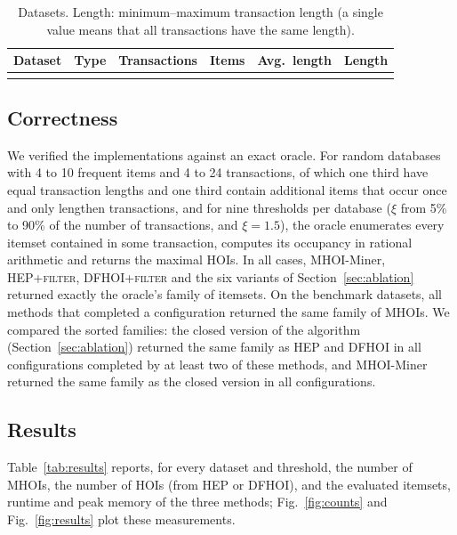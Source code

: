 \documentclass[pdflatex,sn-mathphys,Numbered]{sn-jnl}
\theoremstyle{thmstyleone}
\theoremstyle{thmstyletwo}
\theoremstyle{thmstylethree}
\newcommand{\Algo}{MHOI-Miner}
\begin{document}
\begin{table}[t]
\caption{Datasets. Length: minimum--maximum transaction length (a single value means that all transactions have the same length).}\label{tab:datasets}
\centering
\footnotesize
\begin{tabular}{@{}llrrrr@{}}
\toprule
Dataset & Type & Transactions & Items & Avg.\ length & Length \\
\midrule
{}{datasets.tex}
\botrule
\end{tabular}
\end{table}

\subsection{Correctness}\label{sec:correct-exp}

We verified the implementations against an exact oracle. For \NumOracleDatabases{} random databases with 4 to 10 frequent items and 4 to 24 transactions, of which one third have equal transaction lengths and one third contain additional items that occur once and only lengthen transactions, and for nine thresholds per database ($\xi$ from 5\% to 90\% of the number of transactions, and $\xi = 1.5$), the oracle enumerates every itemset contained in some transaction, computes its occupancy in rational arithmetic and returns the maximal HOIs. In all \NumOracleCases{} cases, \Algo{}, \textsc{HEP+filter}, \textsc{DFHOI+filter} and the six variants of Section~\ref{sec:ablation} returned exactly the oracle's family of itemsets. On the benchmark datasets, all methods that completed a configuration returned the same family of MHOIs. We compared the sorted families: the closed version of the algorithm (Section~\ref{sec:ablation}) returned the same family as HEP and DFHOI in all \SetParityChecked{} configurations completed by at least two of these methods, and \Algo{} returned the same family as the closed version in all \NumSettings{} configurations.

\subsection{Results}\label{sec:results}

Table~\ref{tab:results} reports, for every dataset and threshold, the number of MHOIs, the number of HOIs (from HEP or DFHOI), and the evaluated itemsets, runtime and peak memory of the three methods; Fig.~\ref{fig:counts} and Fig.~\ref{fig:results} plot these measurements.
\end{document}
